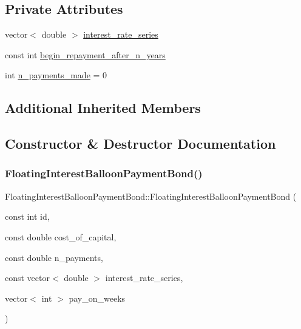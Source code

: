 \subsection*{Private Attributes}
\begin{DoxyCompactItemize}
\item 
vector$<$ double $>$ \mbox{\hyperlink{classFloatingInterestBalloonPaymentBond_a36c73466753c976e513c6763f79f58ad_a36c73466753c976e513c6763f79f58ad}{interest\+\_\+rate\+\_\+series}}
\item 
const int \mbox{\hyperlink{classFloatingInterestBalloonPaymentBond_a439428fff4f2d4ba5d0b593e5d30687f_a439428fff4f2d4ba5d0b593e5d30687f}{begin\+\_\+repayment\+\_\+after\+\_\+n\+\_\+years}}
\item 
int \mbox{\hyperlink{classFloatingInterestBalloonPaymentBond_afc1a77eb5d799201c7ef5c52ef5df374_afc1a77eb5d799201c7ef5c52ef5df374}{n\+\_\+payments\+\_\+made}} = 0
\end{DoxyCompactItemize}
\subsection*{Additional Inherited Members}


\subsection{Constructor \& Destructor Documentation}
\mbox{\label{classFloatingInterestBalloonPaymentBond_aa42f50447a3dd1bd6959e8c4bd0c2421_aa42f50447a3dd1bd6959e8c4bd0c2421}} 
\subsubsection{\texorpdfstring{Floating\+Interest\+Balloon\+Payment\+Bond()}{FloatingInterestBalloonPaymentBond()}\hspace{0.1cm}{\footnotesize\ttfamily [1/2]}}
{\footnotesize\ttfamily Floating\+Interest\+Balloon\+Payment\+Bond\+::\+Floating\+Interest\+Balloon\+Payment\+Bond (\begin{DoxyParamCaption}\item[{const int}]{id,  }\item[{const double}]{cost\+\_\+of\+\_\+capital,  }\item[{const double}]{n\+\_\+payments,  }\item[{const vector$<$ double $>$}]{interest\+\_\+rate\+\_\+series,  }\item[{vector$<$ int $>$}]{pay\+\_\+on\+\_\+weeks }\end{DoxyParamCaption})}


